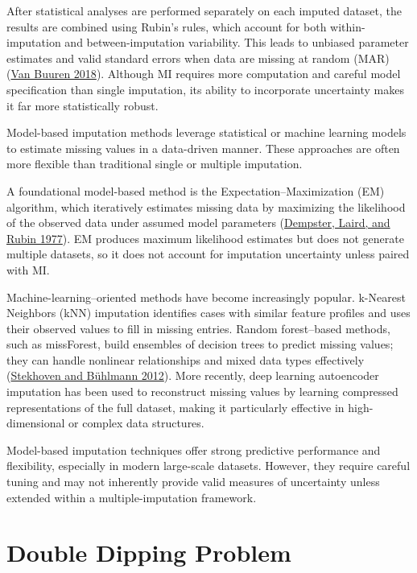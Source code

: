 \documentclass[
  12pt,
]{article}
\begin{document}
After statistical analyses are performed separately on each imputed
dataset, the results are combined using Rubin's rules, which account for
both within-imputation and between-imputation variability. This leads to
unbiased parameter estimates and valid standard errors when data are
missing at random (MAR) 
(\protect\hyperlink{ref-vanBuuren2018}{Van Buuren 2018}). Although MI requires more
computation and careful model specification than single imputation, its
ability to incorporate uncertainty makes it far more statistically
robust.

Model-based imputation methods leverage statistical or machine learning
models to estimate missing values in a data-driven manner. These
approaches are often more flexible than traditional single or multiple
imputation.

A foundational model-based method is the Expectation--Maximization (EM)
algorithm, which iteratively estimates missing data by maximizing the
likelihood of the observed data under assumed model parameters
(\protect\hyperlink{ref-dempster1977maximum}{Dempster, Laird, and Rubin
1977}). EM produces maximum likelihood estimates but does not generate
multiple datasets, so it does not account for imputation uncertainty
unless paired with MI.

Machine-learning--oriented methods have become increasingly popular.
k-Nearest Neighbors (kNN) imputation identifies cases with similar
feature profiles and uses their observed values to fill in missing
entries. Random forest--based methods, such as missForest, build
ensembles of decision trees to predict missing values; they can handle
nonlinear relationships and mixed data types effectively
(\protect\hyperlink{ref-Stekhoven2012}{Stekhoven and Bühlmann 2012}).
More recently, deep learning autoencoder imputation has been used to
reconstruct missing values by learning compressed representations of the
full dataset, making it particularly effective in high-dimensional or
complex data structures.

Model-based imputation techniques offer strong predictive performance
and flexibility, especially in modern large-scale datasets. However,
they require careful tuning and may not inherently provide valid
measures of uncertainty unless extended within a multiple-imputation
framework.

\section{Double Dipping Problem}
\end{document}
